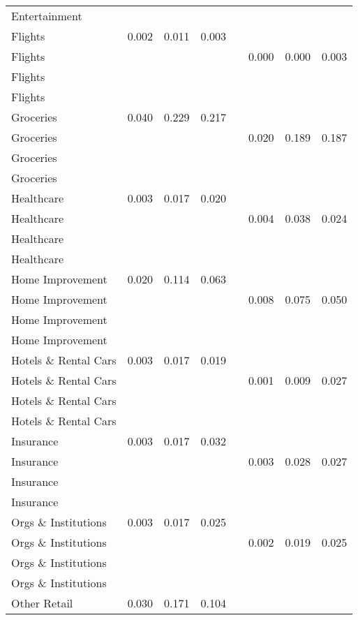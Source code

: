 \begin{table}[ht]
\begin{tabular}{lccccccc}
  Entertainment &  &  &  &  &  &  &  \\ 
  Flights & 0.002 & 0.011 & 0.003 &  &  &  &  \\ 
  Flights &  &  &  &  & 0.000 & 0.000 & 0.003 \\ 
  Flights &  &  &  &  &  &  &  \\ 
  Flights &  &  &  &  &  &  &  \\ 
  Groceries & 0.040 & 0.229 & 0.217 &  &  &  &  \\ 
  Groceries &  &  &  &  & 0.020 & 0.189 & 0.187 \\ 
  Groceries &  &  &  &  &  &  &  \\ 
  Groceries &  &  &  &  &  &  &  \\ 
  Healthcare & 0.003 & 0.017 & 0.020 &  &  &  &  \\ 
  Healthcare &  &  &  &  & 0.004 & 0.038 & 0.024 \\ 
  Healthcare &  &  &  &  &  &  &  \\ 
  Healthcare &  &  &  &  &  &  &  \\ 
  Home Improvement & 0.020 & 0.114 & 0.063 &  &  &  &  \\ 
  Home Improvement &  &  &  &  & 0.008 & 0.075 & 0.050 \\ 
  Home Improvement &  &  &  &  &  &  &  \\ 
  Home Improvement &  &  &  &  &  &  &  \\ 
  Hotels \& Rental Cars & 0.003 & 0.017 & 0.019 &  &  &  &  \\ 
  Hotels \& Rental Cars &  &  &  &  & 0.001 & 0.009 & 0.027 \\ 
  Hotels \& Rental Cars &  &  &  &  &  &  &  \\ 
  Hotels \& Rental Cars &  &  &  &  &  &  &  \\ 
  Insurance & 0.003 & 0.017 & 0.032 &  &  &  &  \\ 
  Insurance &  &  &  &  & 0.003 & 0.028 & 0.027 \\ 
  Insurance &  &  &  &  &  &  &  \\ 
  Insurance &  &  &  &  &  &  &  \\ 
  Orgs \& Institutions & 0.003 & 0.017 & 0.025 &  &  &  &  \\ 
  Orgs \& Institutions &  &  &  &  & 0.002 & 0.019 & 0.025 \\ 
  Orgs \& Institutions &  &  &  &  &  &  &  \\ 
  Orgs \& Institutions &  &  &  &  &  &  &  \\ 
  Other Retail & 0.030 & 0.171 & 0.104 &  &  &  &  \\ 

\end{tabular}
\end{table}
